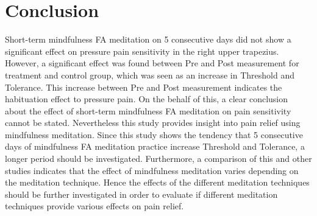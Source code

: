 \section{Conclusion}
Short-term mindfulness FA meditation on 5 consecutive days did not show a significant effect on pressure pain sensitivity in the right upper trapezius. However, a significant effect was found between Pre and Post measurement for treatment and control group, which was seen as an increase in Threshold and Tolerance. This increase between Pre and Post measurement indicates the habituation effect to pressure pain.
On the behalf of this, a clear conclusion about the effect of short-term mindfulness FA meditation on pain sensitivity cannot be stated. Nevertheless this study provides insight into pain relief using mindfulness meditation.
Since this study shows the tendency that 5 consecutive days of mindfulness FA meditation practice increase Threshold and Tolerance, a longer period should be investigated. 
Furthermore, a comparison of this and
other studies indicates that the effect of mindfulness meditation varies depending on the
meditation technique. Hence the effects of the different meditation techniques should be
further investigated in order to evaluate if different meditation techniques provide various
effects on pain relief.

